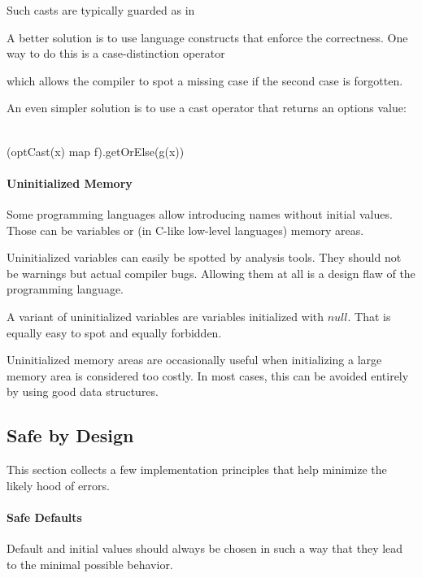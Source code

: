 Such casts are typically guarded as in
\begin{acode}
\end{acode}

A better solution is to use language constructs that enforce the correctness.
One way to do this is a case-distinction operator
\begin{acode}
\end{acode}
which allows the compiler to spot a missing case if the second case is forgotten.

An even simpler solution is to use a cast operator that returns an options value:
\begin{acode}
\\
(optCast(x)\; map\; f).getOrElse(g(x))
\end{acode}

\paragraph{Uninitialized Memory}
Some programming languages allow introducing names without initial values.
Those can be variables or (in C-like low-level languages) memory areas.

Uninitialized variables can easily be spotted by analysis tools.
They should not be warnings but actual compiler bugs.
Allowing them at all is a design flaw of the programming language.

A variant of uninitialized variables are variables initialized with $null$.
That is equally easy to spot and equally forbidden.

Uninitialized memory areas are occasionally useful when initializing a large memory area is considered too costly.
In most cases, this can be avoided entirely by using good data structures.


\subsection{Safe by Design}

This section collects a few implementation principles that help minimize the likely hood of errors.

\paragraph{Safe Defaults}
Default and initial values should always be chosen in such a way that they lead to the minimal possible behavior.

